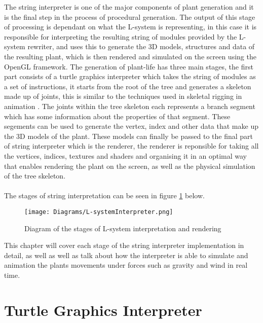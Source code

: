 
\lettrine[lines=3]{T}{}he string interpreter is one of the major components of plant generation and it is the final step in the process of procedural generation. The output of this stage of processing is dependant on what the L-system is representing, in this case it is responsible for interpreting the resulting string of modules provided by the L-system rewriter, and uses this to generate the 3D models, structures and data of the resulting plant, which is then rendered and simulated on the screen using the OpenGL framework. The generation of plant-life has three main stages, the first part consists of a turtle graphics interpreter which takes the string of modules as a set of instructions, it starts from the root of the tree and generates a skeleton made up of joints, this is similar to the techniques used in skeletal rigging in animation \cite{gregory2014game}. The joints within the tree skeleton each represents a branch segment which has some information about the properties of that segment. These segements can be used to generate the vertex, index and other data that make up the 3D models of the plant. These models can finally be passed to the final part of string interpreter which is the renderer, the renderer is reponsible for taking all the vertices, indices, textures and shaders and organising it in an optimal way that enables rendering the plant on the screen, as well as the physical simulation of the tree skeleton. \\
\\
The stages of string interpretation can be seen in figure \ref{l-system interpreter} below. 

\begin{figure}[htbp]
	{\centering
		\vspace{7px}
		\texttt{[image: Diagrams/L-systemInterpreter.png]}
		\caption{Diagram of the stages of L-system interpretation and rendering} \label{l-system interpreter}
	}
\end{figure}

\noindent
This chapter will cover each stage of the string interpreter implementation in detail, as well as well as talk about how the interpreter is able to simulate and animation the plants movements under forces such as gravity and wind in real time. 

\section{Turtle Graphics Interpreter}

